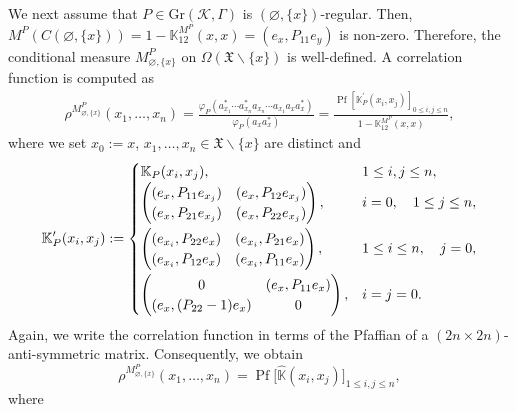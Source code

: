 \documentclass[pdftex]{sigma}
\numberwithin{equation}{section}
\newcommand{\pr}[1]{#1^{\prime}}
\newcommand{\pf}{\operatorname{Pf}}
\newcommand{\mfrak}[1]{\mathfrak{#1}}
\newcommand{\mcal}[1]{\mathcal{#1}}
\newcommand{\mbb}[1]{\mathbb{#1}}
\newcommand{\mrm}[1]{\mathrm{#1}}
\newcommand{\what}[1]{\widehat{#1}}
\begin{document}
We next assume that $P\in \mrm{Gr}(\mcal{K},\Gamma)$ is $(\varnothing,\{x\})$-regular. Then, $M^{P}(C(\varnothing,\{x\}))=1-\mbb{K}^{M^{P}}_{12}(x,x)=(e_{x},P_{11}e_{y})$ is non-zero. Therefore, the conditional measure $M^{P}_{\varnothing,\{x\}}$ on $\Omega (\mfrak{X}\backslash\{x\})$ is well-defined. A correlation function is computed as
\begin{gather*}
	\rho^{M^{P}_{\varnothing,\{x\}}}(x_{1},\dots, x_{n}) =\frac{\varphi_{P}(a_{x_{1}}^{\ast}\cdots a_{x_{n}}^{\ast}a_{x_{n}}\cdots a_{x_{1}}a_{x}a^{\ast}_{x})}{\varphi_{P}(a_{x}a^{\ast}_{x})}
	 =\frac{\pf [\pr{\mbb{K}}_{P}(x_{i},x_{j}) ]_{0\le i,j\le n}}{1-\mbb{K}^{M^{P}}_{12}(x,x)},
\end{gather*}
where we set $x_{0}:=x$, $x_{1},\dots, x_{n}\in \mfrak{X}\backslash\{x\}$ are distinct and
\begin{gather*}
	\pr{\mbb{K}}_{P}(x_{i},x_{j}):=
	\begin{cases}
		\mbb{K}_{P}(x_{i},x_{j}), & 1\le i,j\le n, \\
		\left(
		\begin{matrix}
			(e_{x},P_{11}e_{x_{j}}) & (e_{x},P_{12}e_{x_{j}}) \\
			(e_{x}, P_{21}e_{x_{j}}) & (e_{x},P_{22}e_{x_{j}})
		\end{matrix}
		\right), & i=0,\quad 1\le j\le n, \vspace{1mm}\\
		\left(
		\begin{matrix}
			(e_{x_{i}},P_{22}e_{x}) & (e_{x_{i}},P_{21}e_{x}) \\
			(e_{x_{i}}, P_{12}e_{x}) & (e_{x_{i}},P_{11}e_{x})
		\end{matrix}
		\right), & 1\le i \le n,\quad j=0, \vspace{1mm}\\
		\left(
		\begin{matrix}
			0 & (e_{x},P_{11}e_{x}) \\
			(e_{x}, (P_{22}-1)e_{x}) & 0
		\end{matrix}
		\right), & i=j=0.
	\end{cases}
\end{gather*}
Again, we write the correlation function in terms of the Pfaffian of a $(2n\times 2n)$-anti-symmetric matrix. Consequently, we obtain
\begin{equation*}
	\rho^{M^{P}_{\varnothing,\{x\}}}(x_{1},\dots, x_{n})=\pf\big[\what{\mbb{K}}(x_{i},x_{j})\big]_{1\le i,j\le n},
\end{equation*}
where
\end{document}
